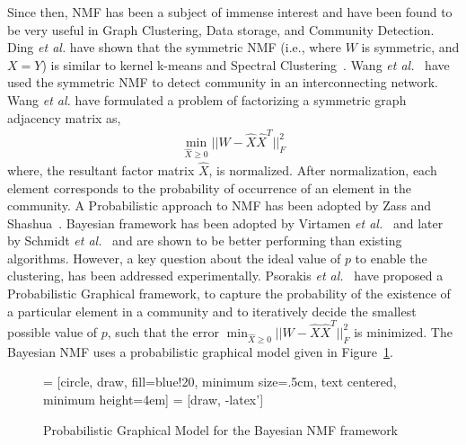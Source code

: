 Since then, NMF has been a subject of immense interest and have been found to be very useful in Graph Clustering, Data storage, and Community Detection.
Ding \textit{et al.} have shown that the symmetric NMF (i.e., where $W$ is symmetric, and $X = Y$) is similar to kernel k-means and Spectral Clustering~\cite{ding2005equivalence}. Wang \textit{et al.}~\cite{wang2011community} have used the symmetric NMF to detect community in an interconnecting network. Wang \textit{et al.} have formulated a problem of factorizing a symmetric graph adjacency matrix as,
\begin{align}
\min_{\hat{X} \geq 0}  \bigg| \bigg| W - \hat{X}\hat{X}^T \bigg| \bigg|_{F}^2
\end{align}
where, the resultant factor matrix $\hat{X}$, is normalized. After normalization, each element corresponds to the probability of occurrence of an element in the community. A  Probabilistic approach to NMF has been adopted by Zass and Shashua~\cite{zass2005unifying}. Bayesian framework has been adopted by Virtamen \textit{et al.}~\cite{virtanen2008bayesian} and later by Schmidt \textit{et al.}~\cite{schmidt2009bayesian} and are shown to be better performing than existing algorithms. However, a key question about the ideal value of $p$ to enable the clustering, has been addressed experimentally. Psorakis \textit{et al.}~\cite{psorakis2011overlapping} have proposed a Probabilistic Graphical framework, to capture the probability of the existence of a particular element in a community and to iteratively decide the smallest possible value of $p$, such that the error $\min_{\hat{X} \geq 0}  \bigg| \bigg| W - \hat{X}\hat{X}^T \bigg| \bigg|_{F}^2$ is minimized. The Bayesian NMF uses a probabilistic graphical model given in Figure~\ref{bnmf}.  

\begin{figure}[H]
\centering
{} = [circle, draw, fill=blue!20, 
    minimum size=.5cm, text centered, minimum height=4em]
 = [draw, -latex']
\caption{Probabilistic Graphical Model for the Bayesian NMF framework}
\label{bnmf}
\end{figure}

